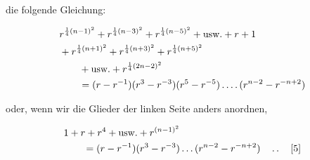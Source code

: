 die folgende Gleichung:

\[
\begin{aligned}
&r^{\frac14(n-1)^2}+r^{\frac14(n-3)^2}+r^{\frac14(n-5)^2}+\text{usw.}+r+1\\
&+r^{\frac14(n+1)^2}+r^{\frac14(n+3)^2}+r^{\frac14(n+5)^2}\\&\qquad+\text{usw.}+r^{\frac14(2n-2)^2}\\
&\qquad=(r-r^{-1})(r^3-r^{-3})(r^5-r^{-5})\mathinner{.\,.\,.\,.}(r^{n-2}-r^{-n+2})
\end{aligned}
\]

oder, wenn wir die Glieder der linken Seite anders anordnen,

\[
\begin{aligned}
&1+r+r^4+\text{usw.}+r^{(n-1)^2}\\&\qquad=(r-r^{-1})(r^3-r^{-3})\ldots(r^{n-2}-r^{-n+2})\quad\mathinner{.\,.}\quad[5]
\end{aligned}
\]

